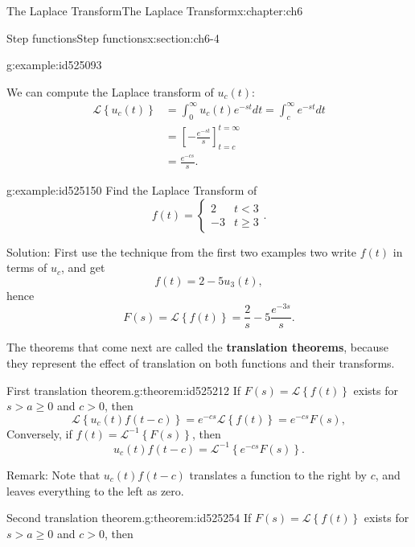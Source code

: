 \documentclass[oneside,10pt,]{book}
\newcommand{\terminology}[1]{\textbf{#1}}
\numberwithin{equation}{section}
\numberwithin{equation}{section}
\newcommand{\lt}{<}
\newcommand{\amp}{&}
\begin{document}
\begin{chapterptx}{The Laplace Transform}{}{The Laplace Transform}{}{}{x:chapter:ch6}
\begin{sectionptx}{Step functions}{}{Step functions}{}{}{x:section:ch6-4}
\begin{example}{}{g:example:id525093}
%
\end{example}
We can compute the Laplace transform of \(u_{c}(t)\):%
\begin{align*}
\mathcal{L}\left\{ u_{c}(t)\right\}  \amp =\int_{0}^{\infty}u_{c}(t)e^{-st}dt=\int_{c}^{\infty}e^{-st}dt\\
\amp =\left[-\frac{e^{-st}}{s}\right]_{t=c}^{t=\infty}\\
\amp =\frac{e^{-cs}}{s}.
\end{align*}
%
\begin{example}{}{g:example:id525150}%
Find the Laplace Transform of%
\begin{equation*}
f(t)=\begin{cases}
2 \amp t\lt3\\
-3 \amp t\geq3
\end{cases}.
\end{equation*}
%
\par
Solution: First use the technique from the first two examples two write \(f(t)\) in terms of \(u_{c}\), and get%
\begin{equation*}
f(t)=2-5u_{3}(t),
\end{equation*}
hence%
\begin{equation*}
F(s)=\mathcal{L}\left\{ f(t)\right\} =\frac{2}{s}-5\frac{e^{-3s}}{s}.
\end{equation*}
%
\end{example}
The theorems that come next are called the \terminology{translation theorems}, because they represent the effect of translation on both functions and their transforms.%
\begin{theorem}{First translation theorem.}{}{g:theorem:id525212}%
If \(F(s)=\mathcal{L}\left\{ f(t)\right\} \) exists for \(s>a\geq0\) and \(c>0\), then%
\begin{equation*}
\mathcal{L}\left\{ u_{c}(t)f\left(t-c\right)\right\} =e^{-cs}\mathcal{L}\left\{ f(t)\right\} =e^{-cs}F(s),
\end{equation*}
Conversely, if \(f(t)=\mathcal{L}^{-1}\left\{ F(s)\right\} \), then%
\begin{equation*}
u_{c}(t)f\left(t-c\right) =\mathcal{L}^{-1}\left\{ e^{-cs}F(s)\right\} .
\end{equation*}
%
\end{theorem}
Remark: Note that \(u_{c}(t)f(t-c)\) translates a function to the right by \(c\), and leaves everything to the left as zero.%
\begin{theorem}{Second translation theorem.}{}{g:theorem:id525254}%
If \(F(s)=\mathcal{L}\left\{ f(t)\right\} \) exists for \(s>a\geq0\) and \(c>0\), then%

\end{theorem}
\end{sectionptx}
\end{chapterptx}
\end{document}
